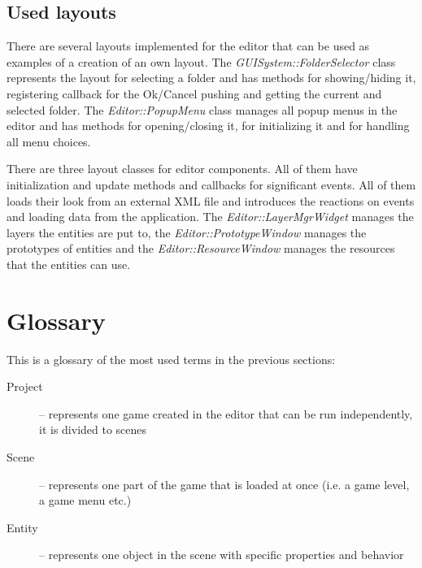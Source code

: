 \subsection{Used layouts}

There are several layouts implemented for the editor that can be used as examples of a creation of an own layout. The \emph{GUISystem::FolderSelector} class represents the layout for selecting a folder and has methods for showing/hiding it, registering callback for the Ok/Cancel pushing and getting the current and selected folder. The \emph{Editor::PopupMenu} class manages all popup menus in the editor and has methods for opening/closing it, for initializing it and for handling all menu choices.

There are three layout classes for editor components. All of them have initialization and update methods and callbacks for significant events. All of them loads their look from an external XML file and introduces the reactions on events and loading data from the application. The \emph{Editor::LayerMgrWid\-get} manages the layers the entities are put to, the \emph{Editor::PrototypeWindow} manages the prototypes of entities and the \emph{Editor::ResourceWindow} manages the resources that the entities can use.

\section{Glossary}
This is a glossary of the most used terms in the previous sections:

\begin{description}
  \item[Project] -- represents one game created in the editor that can be run independently, it is divided to scenes
  \item[Scene] -- represents one part of the game that is loaded at once (i.e. a game level, a game menu etc.)
  \item[Entity] -- represents one object in the scene with specific properties and behavior
\end{description}